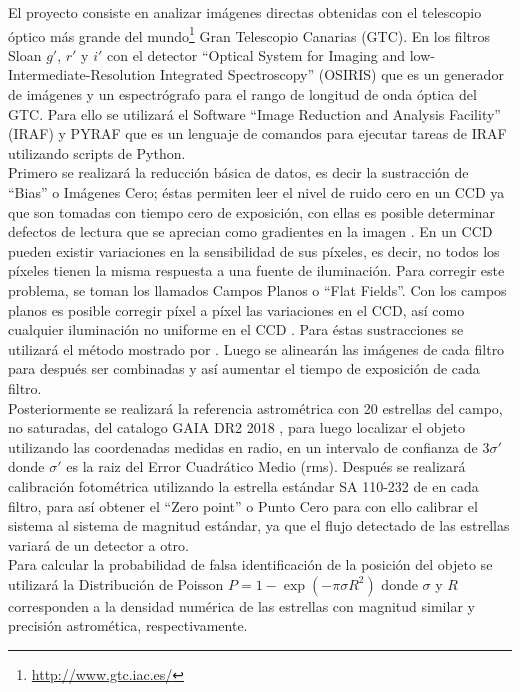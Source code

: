 \documentclass[12pt,spanish,letterpage, twoside, openright]{article}
\begin{document}
El proyecto consiste en analizar imágenes directas obtenidas con el telescopio óptico más grande del mundo\footnote{\url{http://www.gtc.iac.es/}} Gran Telescopio Canarias (GTC). En los filtros Sloan $g'$, $r'$ y $i'$ con el detector ``Optical System for Imaging and low-Intermediate-Resolution Integrated Spectroscopy'' (OSIRIS) que es un generador de imágenes y un espectrógrafo para el rango de longitud de onda óptica del GTC. Para ello se utilizará el Software ``Image Reduction and Analysis Facility'' (IRAF) y PYRAF que es un lenguaje de comandos para ejecutar tareas de IRAF
utilizando scripts de Python.
\\ 

Primero se realizará la reducción básica de datos, es decir la sustracción de ``Bias'' o Imágenes Cero; éstas  permiten leer el nivel de ruido cero  en un CCD ya que son tomadas con tiempo cero de exposición, con ellas es posible determinar defectos de lectura que se aprecian como gradientes en la imagen  \citep[e.g.,][]{howell_2006,AvilaOAN}.
En un CCD  pueden existir variaciones en la sensibilidad de sus píxeles, es decir, no todos los píxeles tienen la misma respuesta a una fuente de iluminación. Para corregir este problema, se toman los llamados Campos Planos o ``Flat Fields''. Con los campos planos es posible corregir píxel a píxel las variaciones en el CCD, así como cualquier iluminación no uniforme en el CCD \citep[e.g.,][]{howell_2006,AvilaOAN}. Para éstas sustracciones se utilizará el método mostrado por \citet{AvilaOAN}. Luego se alinearán las imágenes de cada filtro para después ser combinadas y así aumentar el tiempo de exposición de cada filtro. \\

Posteriormente se realizará la referencia astrométrica con 20 estrellas del campo, no saturadas, del catalogo GAIA DR2 2018 \citep{gaia2}, para luego localizar el objeto utilizando las coordenadas medidas en radio, en un intervalo de confianza de $3\sigma'$ donde $\sigma'$ es la raiz del Error Cuadrático Medio (rms).   Después se realizará calibración fotométrica utilizando la estrella estándar SA 110-232 de \citet{smith2002} en cada filtro, para así obtener el ``Zero point'' o Punto Cero para con ello calibrar el sistema al sistema de magnitud estándar, ya que el flujo detectado de las estrellas variará de un detector a otro.\\

Para calcular la probabilidad de falsa identificación de la posición del objeto se utilizará la Distribución de Poisson $P=1-\exp(-\pi \sigma R^2)$ donde $\sigma$ y $R$ corresponden a la densidad numérica de las estrellas con magnitud similar y precisión astromética, respectivamente. \\
\end{document}
